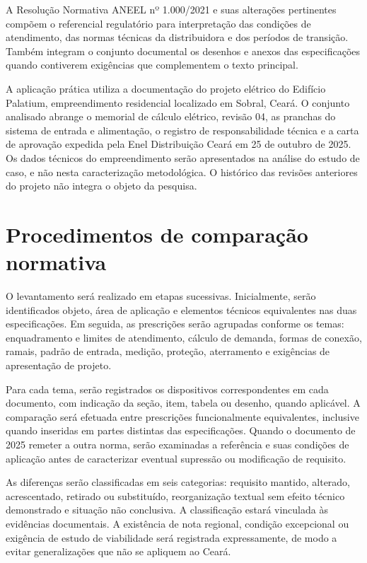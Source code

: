 A Resolução Normativa ANEEL nº 1.000/2021 e suas alterações pertinentes compõem o referencial regulatório para interpretação das condições de atendimento, das normas técnicas da distribuidora e dos períodos de transição. Também integram o conjunto documental os desenhos e anexos das especificações quando contiverem exigências que complementem o texto principal.

A aplicação prática utiliza a documentação do projeto elétrico do Edifício Palatium, empreendimento residencial localizado em Sobral, Ceará. O conjunto analisado abrange o memorial de cálculo elétrico, revisão 04, as pranchas do sistema de entrada e alimentação, o registro de responsabilidade técnica e a carta de aprovação expedida pela Enel Distribuição Ceará em 25 de outubro de 2025. Os dados técnicos do empreendimento serão apresentados na análise do estudo de caso, e não nesta caracterização metodológica. O histórico das revisões anteriores do projeto não integra o objeto da pesquisa.

\section{Procedimentos de comparação normativa}
\label{sec:procedimento}

O levantamento será realizado em etapas sucessivas. Inicialmente, serão identificados objeto, área de aplicação e elementos técnicos equivalentes nas duas especificações. Em seguida, as prescrições serão agrupadas conforme os temas: enquadramento e limites de atendimento, cálculo de demanda, formas de conexão, ramais, padrão de entrada, medição, proteção, aterramento e exigências de apresentação de projeto.

Para cada tema, serão registrados os dispositivos correspondentes em cada documento, com indicação da seção, item, tabela ou desenho, quando aplicável. A comparação será efetuada entre prescrições funcionalmente equivalentes, inclusive quando inseridas em partes distintas das especificações. Quando o documento de 2025 remeter a outra norma, serão examinadas a referência e suas condições de aplicação antes de caracterizar eventual supressão ou modificação de requisito.

As diferenças serão classificadas em seis categorias: requisito mantido, alterado, acrescentado, retirado ou substituído, reorganização textual sem efeito técnico demonstrado e situação não conclusiva. A classificação estará vinculada às evidências documentais. A existência de nota regional, condição excepcional ou exigência de estudo de viabilidade será registrada expressamente, de modo a evitar generalizações que não se apliquem ao Ceará.

